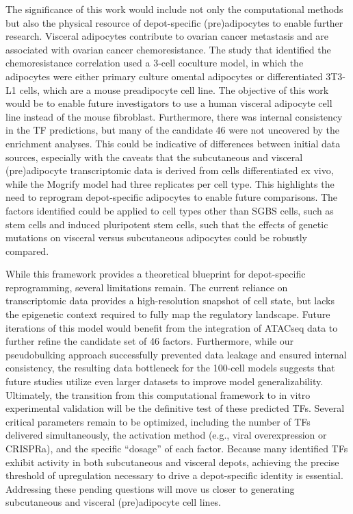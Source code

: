 The significance of this work would include not only the computational methods but also the physical resource of depot-specific (pre)adipocytes to enable further research. Visceral adipocytes contribute to ovarian cancer metastasis\cite{Nieman2011-hq} and are associated with ovarian cancer chemoresistance\cite{Lin2024-ov}. The study that identified the chemoresistance correlation used a 3-cell coculture model, in which the adipocytes were either primary culture omental adipocytes or differentiated 3T3-L1 cells, which are a mouse preadipocyte cell line. The objective of this work would be to enable future investigators to use a human visceral adipocyte cell line instead of the mouse fibroblast. Furthermore, there was internal consistency in the TF predictions, but many of the candidate 46 were not uncovered by the enrichment analyses. This could be indicative of differences between initial data sources, especially with the caveats that the subcutaneous and visceral (pre)adipocyte transcriptomic data is derived from cells differentiated ex vivo\cite{Laber2023-qe}, while the Mogrify model had three replicates per cell type\cite{Rackham2016-ef}. This highlights the need to reprogram depot-specific adipocytes to enable future comparisons. The factors identified could be applied to cell types other than SGBS cells, such as stem cells and induced pluripotent stem cells, such that the effects of genetic mutations on visceral versus subcutaneous adipocytes could be robustly compared.  

While this framework provides a theoretical blueprint for depot-specific reprogramming, several limitations remain. The current reliance on transcriptomic data provides a high-resolution snapshot of cell state, but lacks the epigenetic context required to fully map the regulatory landscape. Future iterations of this model would benefit from the integration of ATACseq data to further refine the candidate set of 46 factors\cite{Halasz2023-xu,Lee2024-ix}. Furthermore, while our pseudobulking approach successfully prevented data leakage and ensured internal consistency, the resulting data bottleneck for the 100-cell models suggests that future studies utilize even larger datasets to improve model generalizability. Ultimately, the transition from this computational framework to in vitro experimental validation will be the definitive test of these predicted TFs. Several critical parameters remain to be optimized, including the number of TFs delivered simultaneously, the activation method (e.g., viral overexpression or CRISPRa), and the specific “dosage” of each factor. Because many identified TFs exhibit activity in both subcutaneous and visceral depots, achieving the precise threshold of upregulation necessary to drive a depot-specific identity is essential. Addressing these pending questions will move us closer to generating subcutaneous and visceral (pre)adipocyte cell lines.   


